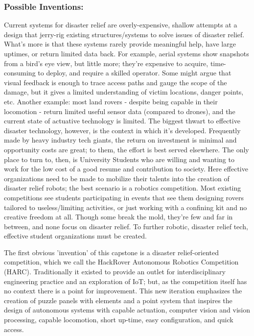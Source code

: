 \documentclass[a4paper, 10pt]{article}
\begin{document}
		\subsubsection*{Possible Inventions:}
		Current systems for disaster relief are overly-expensive, shallow attempts at a design that jerry-rig existing structures/systems to solve issues of disaster relief. What’s more is that these systems rarely provide meaningful help, have large uptimes, or return limited data back. For example, aerial systems show snapshots from a bird's eye view, but little more; they're expensive to acquire, time-consuming to deploy, and require a skilled operator. Some might argue that visual feedback is enough to trace access paths and gauge the scope of the damage, but it gives a limited understanding of victim locations, danger points, etc. Another example: most land rovers - despite being capable in their locomotion - return limited useful sensor data (compared to drones), and the current state of actuative technology is limited. The biggest thwart to effective disaster technology, however, is the context in which it's developed. Frequently made by heavy industry tech giants, the return on investment is minimal and opportunity costs are great; to them, the effort is best served elsewhere. The only place to turn to, then, is University Students who are willing and wanting to work for the low cost of a good resume and contribution to society. Here effective organizations need to be made to mobilize their talents into the creation of disaster relief robots; the best scenario is a robotics competition. Most existing competitions see students participating in events that see them designing rovers tailored to useless/limiting activities, or just working with a confining kit and no creative freedom at all. Though some break the mold, they're few and far in between, and none focus on disaster relief. To further robotic, disaster relief tech, effective student organizations must be created.
		
	The first obvious 'invention' of this capstone is a disaster relief-oriented competition, which we call the HackRover Autonomous Robotics Competition (HARC). Traditionally it existed to provide an outlet for interdisciplinary engineering practice and an exploration of IoT; but, as the competition itself has no context there is a point for improvement. This new iteration emphasizes the creation of puzzle panels with elements and a point system that inspires the design of autonomous systems with capable actuation, computer vision and vision processing, capable locomotion, short up-time, easy configuration, and quick access.
\end{document}
